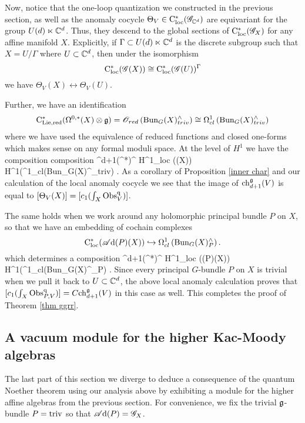 \documentclass[10pt]{amsart}
\def\sAd{\sA{\rm d}}
\begin{document}
Now, notice that the one-loop quantization we constructed in the previous section, as well as the anomaly cocycle $\Theta_V \in {\rm C}_{\rm loc}^*(\mathscr G_{\mathbb C^d})$ are equivariant for the group $U(d) \ltimes \mathbb C^d$. 
Thus, they descend to the global sections of ${\rm C}_{\rm loc}^*(\mathscr G_X)$ for any affine manifold $X$.
Explicitly, if $\Gamma\subset U(d) \ltimes \mathbb C^d$ is the discrete subgroup such that $X = U / \Gamma$ where $U \subset \mathbb C^d$, then under the isomorphism 
\[
{\rm C}_{\rm loc}^*(\mathscr G(X)) \cong {\rm C}_{\rm loc}^*(\mathscr G(U))^\Gamma
\]
we have $\Theta_V(X) \leftrightarrow \Theta_V(U)$.

Further, we have an identification
\[
{\rm C}_{\rm Lie, red}^*(\Omega^{0,*}(X) \otimes \mathfrak g) = \mathscr O_{red}\left({\rm Bun}_G(X)^{\wedge}_{triv}\right) \cong  \Omega^1_{cl} \left({\rm Bun}_G(X)^{\wedge}_{triv}\right) 
\]
where we have used the equivalence of reduced functions and closed one-forms which makes sense on any formal moduli space.
At the level of $H^1$ we have the composition composition
\beqn\label{cohbung}
\Sym^{d+1}(\fg^*)^\fg {} H^1_{\rm loc} (\sG(X)) \to H^1(\Omega^1_{cl}\left({\rm Bun}_G(X)^{\wedge}_{triv}\right) .
\eeqn
As a corollary of Proposition \ref{inner char} and our calculation of the local anomaly cocycle we see that the image of ${\rm ch}_{d+1}^\mathfrak g(V)$ is equal to $[\Theta_V(X)] = [c_1(\int_X {\rm Obs}^{\rm q}_V)]$. 

The same holds when we work around any holomorphic principal bundle $P$ on $X$, so that we have an embedding of cochain complexes
\[
\cloc^*(\sAd(P)(X)) \hookrightarrow  \Omega^1_{cl} \left({\rm Bun}_G(X)^{\wedge}_{P}\right) . 
\]
which determines a composition
\beqn\label{cohbung}
\Sym^{d+1}(\fg^*)^\fg {} H^1_{\rm loc} (\sAd(P)(X)) \to H^1(\Omega^1_{cl}\left({\rm Bun}_G(X)^{\wedge}_{P}\right) .
\eeqn
Since every principal $G$-bundle $P$ on $X$ is trivial when we pull it back to $U\subset \mathbb C^d$, the above local anomaly calculation proves that $[c_1(\int_X {\rm Obs}^{\rm q}_{P,V})] = C {\rm ch}_{d+1}^\mathfrak g (V)$ in this case as well.
This completes the proof of Theorem \ref{thm ggrr}. 

\subsection{A vacuum module for the higher Kac-Moody algebras}

The last part of this section we diverge to deduce a consequence of the quantum Noether theorem using our analysis above by exhibiting a module for the higher affine algebras from the previous section. 
For convenience, we fix the trivial $\mathfrak g$-bundle $P = {\rm triv}$ so that $\sAd(P) = \sG_X$.
\end{document}
